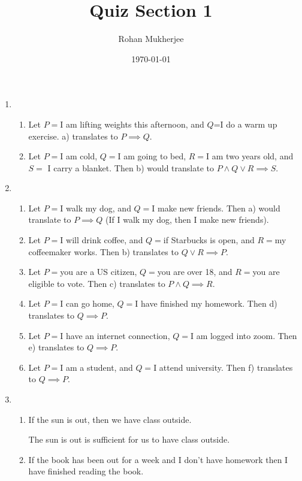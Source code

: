 \documentclass[12pt]{article}
\title{Quiz Section 1}
\date{\today}
\author{Rohan Mukherjee}
\theoremstyle{definition}
\theoremstyle{remark}
\begin{document}
	\maketitle
	\begin{enumerate}[leftmargin=\labelsep]
		\item 
		\begin{enumerate}
			\item Let $P=$I am lifting weights this afternoon, and $Q$=I do a warm up exercise. a) translates to $P \implies Q$.
			\item Let $P=$I am cold, $Q=$I am going to bed, $R=$I am two years old, and $S=$ I carry a blanket. Then b) would translate to $P \land Q \lor R \implies S$.
		\end{enumerate}
	
		\item
		
		
		\begin{enumerate}
			\item 
			Let $P=$I walk my dog, and $Q=$I make new friends. Then a) would translate to $P \implies Q$ (If I walk my dog, then I make new friends).
			\item 
			Let $P=$I will drink coffee, and $Q=$if Starbucks is open, and $R=$my coffeemaker works. Then b) translates to $Q \lor R \implies P$.
			\item 
			Let $P=$you are a US citizen, $Q=$you are over 18, and $R=$you are eligible to vote. Then c) translates to $P \land Q \implies R$.
			\item 
			Let $P=$I can go home, $Q=$I have finished my homework. Then d) translates to $Q \implies P$.
			\item 
			Let $P=$I have an internet connection, $Q=$I am logged into zoom. Then e) translates to $Q \implies P$.
			\item 
			Let $P=$I am a student, and $Q=$I attend university. Then f) translates to $Q \implies P$.
		\end{enumerate}
		\item
		
		\begin{enumerate}
			\item 
			If the sun is out, then we have class outside. 
			
			The sun is out is sufficient for us to have class outside.
			\item 
			If the book has been out for a week and I don't have homework then I have finished reading the book.
			

\end{enumerate}
\end{enumerate}
\end{document}
